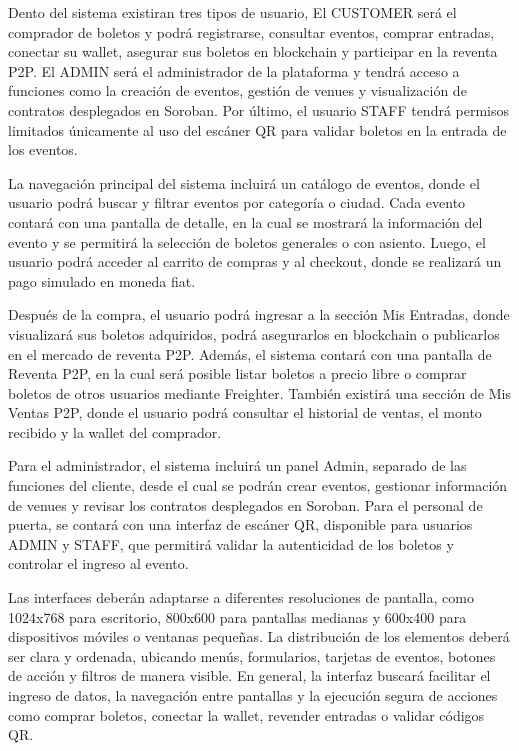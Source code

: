 \documentclass[12pt,letterpaper]{article}
\begin{document}
Dento del sistema existiran tres tipos de usuario, El CUSTOMER será el comprador de boletos y podrá registrarse, consultar eventos, comprar entradas, conectar su wallet, asegurar sus boletos en blockchain y participar en la reventa P2P. El ADMIN será el administrador de la plataforma y tendrá acceso a funciones como la creación de eventos, gestión de venues y visualización de contratos desplegados en Soroban. Por último, el usuario STAFF tendrá permisos limitados únicamente al uso del escáner QR para validar boletos en la entrada de los eventos.

La navegación principal del sistema incluirá un catálogo de eventos, donde el usuario podrá buscar y filtrar eventos por categoría o ciudad. Cada evento contará con una pantalla de detalle, en la cual se mostrará la información del evento y se permitirá la selección de boletos generales o con asiento. Luego, el usuario podrá acceder al carrito de compras y al checkout, donde se realizará un pago simulado en moneda fiat.

Después de la compra, el usuario podrá ingresar a la sección Mis Entradas, donde visualizará sus boletos adquiridos, podrá asegurarlos en blockchain o publicarlos en el mercado de reventa P2P. Además, el sistema contará con una pantalla de Reventa P2P, en la cual será posible listar boletos a precio libre o comprar boletos de otros usuarios mediante Freighter. También existirá una sección de Mis Ventas P2P, donde el usuario podrá consultar el historial de ventas, el monto recibido y la wallet del comprador.

Para el administrador, el sistema incluirá un panel Admin, separado de las funciones del cliente, desde el cual se podrán crear eventos, gestionar información de venues y revisar los contratos desplegados en Soroban. Para el personal de puerta, se contará con una interfaz de escáner QR, disponible para usuarios ADMIN y STAFF, que permitirá validar la autenticidad de los boletos y controlar el ingreso al evento.

Las interfaces deberán adaptarse a diferentes resoluciones de pantalla, como 1024x768 para escritorio, 800x600 para pantallas medianas y 600x400 para dispositivos móviles o ventanas pequeñas. La distribución de los elementos deberá ser clara y ordenada, ubicando menús, formularios, tarjetas de eventos, botones de acción y filtros de manera visible. En general, la interfaz buscará facilitar el ingreso de datos, la navegación entre pantallas y la ejecución segura de acciones como comprar boletos, conectar la wallet, revender entradas o validar códigos QR.
\end{document}
